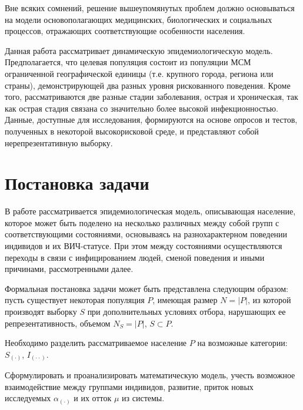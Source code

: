 \documentclass[a4paper]{report}
\begin{document}
	

	
	Вне всяких сомнений, решение вышеупомянутых проблем должно основываться на модели основополагающих медицинских, биологических и социальных процессов, отражающих соответствующие особенности населения. 
	
	Данная работа рассматривает динамическую эпидемиологическую модель. Предполагается, что целевая популяция состоит из популяции МСМ ограниченной географической единицы (т.е. крупного города, региона или страны), демонстрирующей два разных уровня рискованного поведения. Кроме того, рассматриваются две разные стадии заболевания, острая и хроническая, так как острая стадия связана со значительно более высокой инфекционностью. Данные, доступные для исследования, формируются на основе опросов и тестов, полученных в некоторой высокорисковой среде, и представляют собой нерепрезентативную выборку.

	
	
	\chapter*{Постановка задачи}
	
	В работе рассматривается эпидемиологическая модель, описывающая население, которое может быть поделено на несколько различных между собой групп с соответствующими состояниями, основываясь на разнохарактерном поведении индивидов и их ВИЧ-статусе.
	При этом между состояниями осуществляются переходы в связи с инфицированием людей, сменой поведения и иными причинами, рассмотренными далее.
	
	Формальная постановка задачи может быть представлена следующим образом: пусть существует некоторая популяция $P$, имеющая размер $N = |P|$, из которой производят выборку $S$ при дополнительных условиях отбора, нарушающих ее репрезентативность, объемом $N_S = |P|$, $S \subset P$.
	
	Необходимо разделить рассматриваемое население $P$ на возможные категории: $S_{(\cdot)}$, $I_{(\cdot \cdot)}$.
	
	Сформулировать и проанализировать математическую модель, учесть возможное взаимодействие между группами индивидов, развитие, приток новых исследуемых $ \alpha_{(\cdot)}$ и их отток $\mu$ из системы.
	
\end{document}

